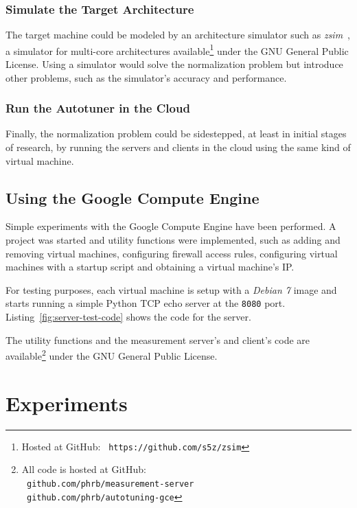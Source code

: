 \documentclass[a4paper, 12pt]{article}
\begin{document}
\subsubsection{Simulate the Target Architecture}

The target machine could be modeled by an architecture simulator such as
\emph{zsim}~\cite{sanchez2013zsim}, a simulator for multi-core architectures
available\footnote{Hosted at GitHub: \texttt{\scriptsize
https://github.com/s5z/zsim}} under the GNU General Public License.  Using a
simulator would solve the normalization problem but introduce other problems,
such as the simulator's accuracy and performance.

\subsubsection{Run the Autotuner in the Cloud}

Finally, the normalization problem could be sidestepped, at least in initial
stages of research, by running the servers and clients in the cloud using
the same kind of virtual machine.

\subsection{Using the Google Compute Engine} \label{sec:pwork}

Simple experiments with the Google Compute Engine have been performed. A
project was started and utility functions were implemented, such as
adding and removing virtual machines, configuring firewall access
rules, configuring virtual machines with a startup script and obtaining a
virtual machine's IP.

For testing purposes, each virtual machine is setup with a \emph{Debian 7}
image and starts running a simple Python TCP echo server at the
\texttt{\footnotesize 8080} port.  Listing~\ref{fig:server-test-code} shows the
code for the server.

The utility functions and the measurement server's and client's code are
available\footnote{All code is hosted at GitHub: \\ \texttt{\scriptsize
github.com/phrb/measurement-server} \\ \texttt{\scriptsize
github.com/phrb/autotuning-gce}} under the GNU General Public License.



\section{Experiments} \label{sec:exp}
\end{document}
